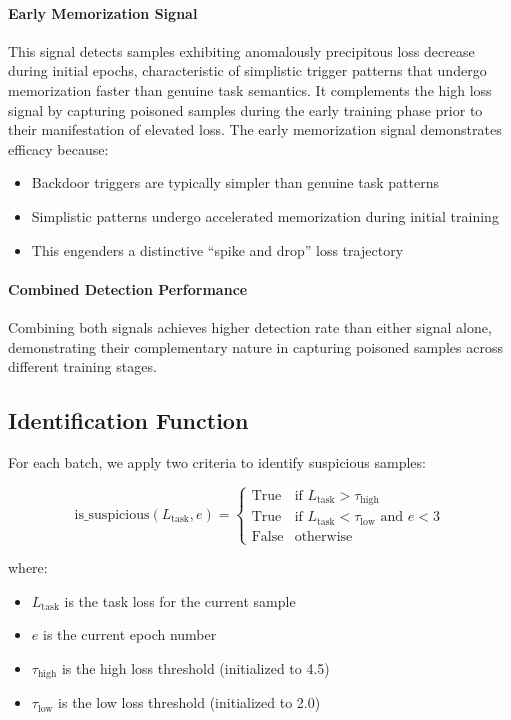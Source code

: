 \paragraph{Early Memorization Signal}
This signal detects samples exhibiting anomalously precipitous loss decrease during initial epochs, characteristic of simplistic trigger patterns that undergo memorization faster than genuine task semantics. It complements the high loss signal by capturing poisoned samples during the early training phase prior to their manifestation of elevated loss. The early memorization signal demonstrates efficacy because:
\begin{itemize}
    \item Backdoor triggers are typically simpler than genuine task patterns
    \item Simplistic patterns undergo accelerated memorization during initial training
    \item This engenders a distinctive ``spike and drop'' loss trajectory
\end{itemize}

\paragraph{Combined Detection Performance}
Combining both signals achieves higher detection rate than either signal alone, demonstrating their complementary nature in capturing poisoned samples across different training stages.

\subsection{Identification Function}
\label{subsec:identification_function}

For each batch, we apply two criteria to identify suspicious samples:

\begin{equation}
\text{is\_suspicious}(L_{\text{task}}, e) =
\begin{cases}
\text{True} & \text{if } L_{\text{task}} > \tau_{\text{high}} \\
\text{True} & \text{if } L_{\text{task}} < \tau_{\text{low}} \text{ and } e < 3 \\
\text{False} & \text{otherwise}
\end{cases}
\label{eq:identification}
\end{equation}

where:
\begin{itemize}
    \item $L_{\text{task}}$ is the task loss for the current sample
    \item $e$ is the current epoch number
    \item $\tau_{\text{high}}$ is the high loss threshold (initialized to 4.5)
    \item $\tau_{\text{low}}$ is the low loss threshold (initialized to 2.0)
\end{itemize}

